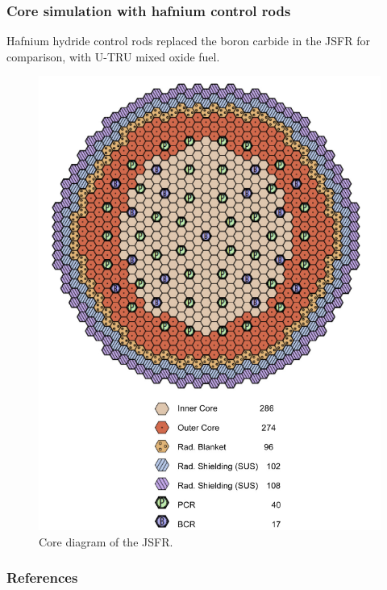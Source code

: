 \documentclass[9pt]{beamer}
\begin{document}
\begin{frame}
\frametitle{Core simulation with hafnium control rods}
Hafnium hydride control rods replaced the boron carbide in the
\gls{JSFR} for comparison, with U-TRU mixed oxide fuel.

\begin{figure}[htbp!]
  \begin{center}
      \includegraphics[scale=0.18]{./images/core.png}
  \end{center}
  \caption{Core diagram of the \gls{JSFR}.}
  \label{fig:core}
\end{figure}

\end{frame}


\begin{frame}[allowframebreaks]
  \frametitle{References}
  
  {\footnotesize  }
\end{frame}

\end{document}
